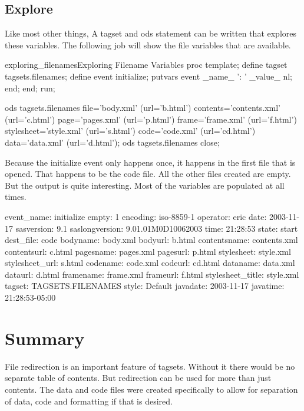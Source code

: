 \subsection{Explore}
Like most other things, A tagset and ods statement can be written that explores
these variables.  The following job will show the file variables that are available. 

\begin{fvcode}{exploring_filenames}{Exploring Filename Variables}
proc template;
    define tagset tagsets.filenames;
        define event initialize;
            putvars event _name_ ': ' _value_ nl;
        end;
    end;
run;

ods tagsets.filenames file='body.xml'  (url='b.html')
                  contents='contents.xml' (url='c.html') 
                      page='pages.xml' (url='p.html')
                     frame='frame.xml' (url='f.html')
                stylesheet='style.xml' (url='s.html')
                      code='code.xml'  (url='cd.html')
                      data='data.xml'  (url='d.html');
ods tagsets.filenames close; 
\end{fvcode}

Because the initialize event only happens once, it happens in the 
first file that is opened.  That happens to be the code file.  All 
the other files created are empty.  But the output is quite interesting.
Most of the variables are populated at all times.

\begin{sfvoutput}
event_name: initialize
empty: 1
encoding: iso-8859-1
operator: eric
date: 2003-11-17
sasversion: 9.1
saslongversion: 9.01.01M0D10062003
time: 21:28:53
state: start
dest_file: code
bodyname: body.xml
bodyurl: b.html
contentsname: contents.xml
contentsurl: c.html
pagesname: pages.xml
pagesurl: p.html
stylesheet: style.xml
stylesheet_url: s.html
codename: code.xml
codeurl: cd.html
dataname: data.xml
dataurl: d.html
framename: frame.xml
frameurl: f.html
stylesheet_title: style.xml
tagset: TAGSETS.FILENAMES
style: Default
javadate: 2003-11-17
javatime: 21:28:53-05:00
\end{sfvoutput}

\section{Summary}
File redirection is an important feature of tagsets.  Without it there would be no
separate table of contents.  But redirection can be used for more than just contents.
The data and code files were created specifically to allow for separation of data, code
and formatting if that is desired.  

